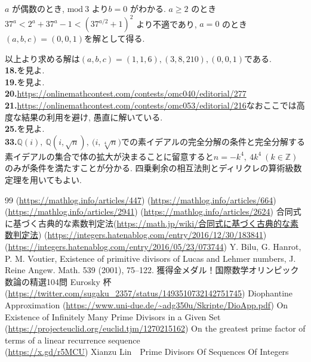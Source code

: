 \documentclass{ltjsarticle}
\theoremstyle{definition}
\begin{document}
$a$ が偶数のとき, $\textrm{mod} ~ 3$ より$b=0$ がわかる. $a\geq2$ のとき
$37^a< 2^a+37^a-1< (37^{a/2}+1)^2$
より不適であり, $a=0$ のとき $(a,b,c)=(0,0,1)$を解として得る.

以上より求める解は$(a,b,c)=(1,1,6),(3,8,210),(0,0,1)$である.\\
\textbf{18.}\cite{kkkaaa}を見よ.\\
\textbf{19.}\cite{ジグモンディー}を見よ.\\
\textbf{20.}\url{https://onlinemathcontest.com/contests/omc040/editorial/277}\\
\textbf{21.}\url{https://onlinemathcontest.com/contests/omc053/editorial/216}なおここでは高度な結果の利用を避け, 愚直に解いている.\\
\textbf{25.}\cite{フィボナッチ平方数}を見よ.\\
\textbf{33.}$\mathbb Q(i),\ \mathbb Q(i,\sqrt n),\ \mathbb(i,\sqrt[4]n)$での素イデアルの完全分解の条件と完全分解する素イデアルの集合で体の拡大が決まることに留意すると$n=-k^4,\ 4k^4\ (k\in \mathbb Z)$のみが条件を満たすことが分かる.
四乗剰余の相互法則とディリクレの算術級数定理を用いてもよい.

\begin{thebibliography}{99}
(\url{https://mathlog.info/articles/447})
(\url{https://mathlog.info/articles/664})
(\url{https://mathlog.info/articles/2941})
(\url{https://mathlog.info/articles/2624})
合同式に基づく古典的な素数判定法(\url{https://math.jp/wiki/合同式に基づく古典的な素数判定法})
(\url{https://integers.hatenablog.com/entry/2016/12/30/183841})
(\url{https://integers.hatenablog.com/entry/2016/05/23/073744})
Y. Bilu, G. Hanrot, P. M. Voutier, Existence of primitive divisors of Lucas and Lehmer numbers, J. Reine Angew. Math. 539 (2001), 75--122.
獲得金メダル！国際数学オリンピック
数論の精選104問
Eurosky 杯(\url{https://twitter.com/sugaku_2357/status/1493510732142751745})
Diophantine Approximation
(\url{https://www.uni-due.de/~adg350u/Skripte/DioApp.pdf})
On Existence of Infinitely Many Prime Divisors in a Given Set\\(\url{https://projecteuclid.org/euclid.tjm/1270215162})
On the greatest prime factor of terms of a linear recurrence sequence\\(\url{https://x.gd/r5MCU})
Xianzu Lin\ \ Prime Divisors Of Sequences Of Integers
\end{thebibliography}
\end{document}
